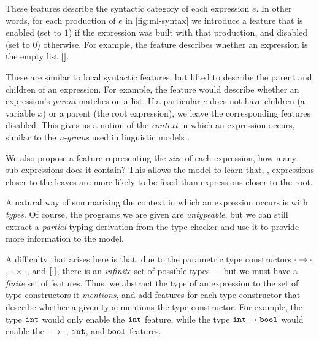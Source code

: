 These features describe the syntactic category of each expression $e$. In other
words, for each production of $e$ in \autoref{fig:ml-syntax} we introduce a
feature that is enabled (set to $1$) if the expression was built with that
production, and disabled (set to $0$) otherwise. For example, the \IsNil feature
describes whether an expression is the empty list $\mathtt{[]}$.


These are similar to local syntactic features, but lifted to describe the parent
and children of an expression. For example, the \IsCaseListP feature would
describe whether an expression's \emph{parent} matches on a list. If a
particular $e$ does not have children (\eg a variable $x$) or a parent (\ie the
root expression), we leave the corresponding features disabled. This gives us a
notion of the \emph{context} in which an expression occurs, similar to the
\emph{n-grams} used in linguistic models \citep{Hindle2012-hf,Gabel2010-el}.

We also propose a feature representing the \emph{size} of each expression, \ie
how many sub-expressions does it contain?
This allows the model to learn that, \eg, expressions closer to the leaves are
more likely to be fixed than expressions closer to the root.

A natural way of summarizing the context in which an expression occurs is with
\emph{types}. Of course, the programs we are given are \emph{untypeable}, but we
can still extract a \emph{partial} typing derivation from the type checker and
use it to provide more information to the model.

A difficulty that arises here is that, due to the parametric type constructors
$\cdot \to \cdot$, $\cdot \times \cdot$, and $[\cdot]$, there is an
\emph{infinite} set of possible types --- but we must have a \emph{finite} set
of features. Thus, we abstract the type of an expression to the set of type
constructors it \emph{mentions}, and add features for each type constructor that
describe whether a given type mentions the type constructor. For example, the
type $\mathtt{int}$ would only enable the $\mathtt{int}$ feature, while the type
$\mathtt{int} \to \mathtt{bool}$ would enable the $\cdot \to \cdot$, $\mathtt{int}$, and
$\mathtt{bool}$ features.

